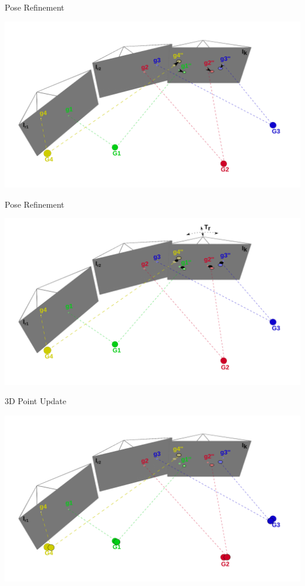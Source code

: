 \documentclass[aspectratio=169]{beamer}
\begin{document}
\begin{frame}{Pose Refinement}
  \begin{center}
    \includegraphics[height=0.9\textheight]{../img/pose_estimation_opt_flow.png}
  \end{center}
\end{frame}

\begin{frame}{Pose Refinement}
  \begin{center}
    \includegraphics[height=0.9\textheight]{../img/pose_estimation_refinement.png}
  \end{center}
\end{frame}

\begin{frame}{3D Point Update}
  \begin{center}
    \includegraphics[height=0.9\textheight]{../img/pose_estimation_point_update.png}
  \end{center}
\end{frame}
\end{document}
